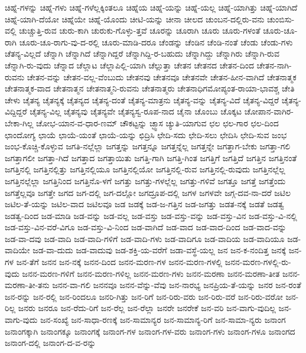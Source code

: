 {ಚಿಹ್ನೆ-ಗಳನ್ನು
ಚಿಹ್ನೆ-ಗಳು
ಚಿಹ್ನೆ-ಗಳೆಲ್ಲಕ್ಕಿಂತಲೂ
ಚಿಹ್ನೆಯ
ಚಿಹ್ನೆ-ಯನ್ನು
ಚಿಹ್ನೆ-ಯಲ್ಲ
ಚಿಹ್ನೆ-ಯಾಗಿತ್ತು
ಚಿಹ್ನೆ-ಯಾಗಿದೆ
ಚಿಹ್ನೆ-ಯಾಗಿ-ದೆಯೋ
ಚಿಹ್ನೆಯೇ
ಚಿಹ್ನೆ-ಯೊಂದು
ಚೀಟಿ-ಯನ್ನು
ಚೀನಾ
ಚೀಲದ
ಚುಂಬನ-ದಲ್ಲಿರು-ವನು
ಚುಂಬಿಸು-ವಲ್ಲಿ
ಚುಚ್ಚುತ್ತಿ-ರುವ
ಚುರು-ಕಾಗಿ
ಚುರುಕು-ಗೊಳ್ಳು-ತ್ತವೆ
ಚೂರನ್ನು
ಚೂರಾಗಿ
ಚೂರು
ಚೂರು-ಗಳಂತೆ
ಚೂರು-ಚೂ-ರಾಗಿ
ಚೂರು-ಚೂ-ರಾಗು-ವು-ದ-ರಲ್ಲಿ
ಚೂರು-ಮಾಡಿ-ದರೂ
ಚೆಂಡನ್ನು
ಚೆಂಡಿನ
ಚೆಂಡಿ-ನಂತೆ
ಚೆಂಡು
ಚೆಂಡು-ಗಳು
ಚೆತನ್ಯ-ವಿಲ್ಲದೆ
ಚೆನ್ನಾಗಿ
ಚೆನ್ನಾಗಿದೆ
ಚೆನ್ನಾಗಿದ್ದರೆ
ಚೆನ್ನಾಗಿದ್ದಿ-ರ-ಬಹುದು
ಚೆನ್ನಾಗಿದ್ದು
ಚೆನ್ನಾಗಿರು
ಚೆನ್ನಾಗಿ-ರುವ
ಚೆನ್ನಾಗಿ-ರು-ವುದು
ಚೆನ್ನಾದ
ಚೆಲ್ಲಾಟ
ಚೆಲ್ಲಾಪಿಲ್ಲಿ-ಯಾಗಿ
ಚೆಲ್ಲುತ್ತಾ
ಚೇತನ
ಚೇತನದ
ಚೇತನ-ದಿಂದ
ಚೇತನ-ನಾಗಿ-ರುವನು
ಚೇತನ-ವನ್ನು
ಚೇತನ-ವಲ್ಲ-ವೆಂಬುದು
ಚೇತನವು
ಚೇತನವೂ
ಚೇತನವೇ
ಚೇತನ-ಹೀನ-ವಾಗಿದೆ
ಚೇತನಾತ್ಮಕ
ಚೇತನಾತ್ಮಕ-ವಾದ
ಚೇತನಾತ್ಮನ
ಚೇತನಾತ್ಮನಿ-ರುವನು
ಚೇತನಾತ್ಮರು
ಚೇತನಾಧಿಗಮೋಪ್ಯಂತ-ರಾಯಾ-ಭಾವಶ್ಚ
ಚೇತಿ
ಚೇಳು
ಚೈತನ್ಯ
ಚೈತನ್ಯಕ್ಕೆ
ಚೈತನ್ಯದ
ಚೈತನ್ಯ-ದಂತೆ
ಚೈತನ್ಯ-ಮಾತ್ರನು
ಚೈತನ್ಯ-ವನ್ನು
ಚೈತನ್ಯ-ವಿದೆ
ಚೈತನ್ಯ-ವಿದ್ದರೆ
ಚೈತನ್ಯ-ವಿದ್ದಿದ್ದರೆ
ಚೈತನ್ಯ-ವಿಲ್ಲ
ಚೈತನ್ಯವು
ಚೈತನ್ಯವೇ
ಚೈತನ್ಯಸ್ವ-ರೂಪ-ನಾದ
ಚೈನಾ
ಚೊಂಬು
ಚೊಕ್ಕಟ
ಚೋಪಾನ-ವಾಗಿರ-ಬೇಕಾ-ಗಿಲ್ಲ
ಚೋಭ-ಯಾನ-ವ-ಧಾರ-ಣಮ್
ಚೌಕಟ್ಟನ್ನು
ಚ್ಛ್ವಾಸ
ಚ್ಯುತಿ-ಯಾಗುವ
ಛಲ
ಛಲ-ಗಾರ
ಛಲ-ದಿಂದ
ಛಾಂದೋಗ್ಯ
ಛಾಯೆ
ಛಾಯೆ-ಯಂತೆ
ಛಾಯೆ-ಯನ್ನು
ಛಿದ್ರಿಸಿ
ಛೇದಿ-ಸದು
ಛೇದಿ-ಸಲು
ಛೇದಿಸಿ
ಛೇದಿ-ಸುವ
ಜಂಭ
ಜಂಭ-ಕೊಚ್ಚಿ-ಕೊಳ್ಳುವ
ಜಗತಿ-ನಲ್ಲೆಲ್ಲಾ
ಜಗತ್ತನ್ನು
ಜಗತ್ತನ್ನೂ
ಜಗತ್ತನ್ನೆಲ್ಲ
ಜಗತ್ತನ್ನೇ
ಜಗತ್ತಾಗ-ಬೇಕು
ಜಗತ್ತಾ-ಗಲಿ
ಜಗತ್ತಾಗಲೀ
ಜಗತ್ತಾ-ಗಿದೆ
ಜಗತ್ತಾದ
ಜಗತ್ತಾಯಿತು
ಜಗತ್ತಿ-ಗಾಗಿ
ಜಗತ್ತಿ-ಗಿಂತ
ಜಗತ್ತಿಗೆ
ಜಗತ್ತಿದೆ
ಜಗತ್ತಿನ
ಜಗತ್ತಿನಂತೆ
ಜಗತ್ತಿನಲ್ಲಿ
ಜಗತ್ತಿನಲ್ಲಿತ್ತು
ಜಗತ್ತಿನಲ್ಲಿಯೂ
ಜಗತ್ತಿನಲ್ಲಿಯೋ
ಜಗತ್ತಿನಲ್ಲಿ-ರುವ
ಜಗತ್ತಿನಲ್ಲಿ-ರುವುದು
ಜಗತ್ತಿನಲ್ಲೆಲ್ಲ
ಜಗತ್ತಿನಲ್ಲೆಲ್ಲಾ
ಜಗತ್ತಿನಿಂದ
ಜಗತ್ತಿನೊ-ಳಗೆ
ಜಗತ್ತು
ಜಗತ್ತು-ಗಳಲ್ಲೆಲ್ಲ
ಜಗತ್ತು-ಗಳಿವೆ
ಜಗತ್ತೂ
ಜಗತ್ತೆ
ಜಗತ್ತೆಂದು
ಜಗತ್ತೆಲ್ಲವೂ
ಜಗತ್ತೇ
ಜಗದ
ಜಗ-ದಲ್ಲಿ
ಜಗ-ದಲ್ಲೋ
ಜಗದ್ರೂಪ-ದಲ್ಲಿ
ಜಗಳ
ಜಗಳವೇ
ಜಗ್ಗ-ದವ-ನಾ-ದರೆ
ಜಟಿಲ
ಜಟಿಲ-ತೆ-ಯನ್ನು
ಜಟಿಲ-ವಾದ
ಜಟಿಲವೂ
ಜಡ
ಜಡಕ್ಕೆ
ಜಡ-ಜ-ಗತ್ತಿನ
ಜಡ-ಜಗತ್ತು
ಜಡತ-ನಕ್ಕೆ
ಜಡತೆ
ಜಡತ್ವ
ಜಡತ್ವ-ದಿಂದ
ಜಡ-ಮಾಡಿ
ಜಡ-ವನ್ನು
ಜಡ-ವಲ್ಲ
ಜಡ-ವಸ್ತು
ಜಡ-ವಸ್ತು-ವನ್ನು
ಜಡ-ವಸ್ತು-ವಿನ
ಜಡ-ವಸ್ತು-ವಿ-ನಲ್ಲಿ
ಜಡ-ವಸ್ತು-ವಿನ-ವರೆ-ವಿಗೂ
ಜಡ-ವಸ್ತು-ವಿ-ನಿಂದ
ಜಡ-ವಾಗಿದೆ
ಜಡ-ವಾದ
ಜಡ-ವಾದ-ದಿಂದ
ಜಡ-ವಾದ-ವನ್ನು
ಜಡ-ವಾ-ದವು
ಜಡ-ವಾದಿ
ಜಡ-ವಾದಿ-ಗಳಿಗೆ
ಜಡ-ವಾದಿ-ಗಳು
ಜಡ-ವಾದಿಗೂ
ಜಡ-ವಾದಿಯ
ಜಡ-ವಾದಿಯೂ
ಜಡ-ವಾದಿಯೇ
ಜಡ-ವಾ-ದುದು
ಜಡ-ವಾದುವು
ಜಡ-ಶಕ್ತಿ-ಯ-ವರೆಗೆ
ಜಡಾ-ವಸ್ಥೆ-ಯಲ್ಲ
ಜನ
ಜನ-ಕ-ನಂದಿತ್ತ
ಜನಕ್ಕೆ
ಜನ-ಗಳ
ಜನ-ತೆಗೆ
ಜನನ
ಜನ-ನಕ್ಕೆ
ಜನನ-ದಿಂದ
ಜನನ-ಮರಣ-ಗಳ
ಜನನ-ಮರಣ-ಗಳಲ್ಲಿ
ಜನನ-ಮರಣ-ಗಳಲ್ಲಿ-ರು-ವುದು
ಜನನ-ಮರಣ-ಗಳಿಗೆ
ಜನನ-ಮರಣ-ಗಳಿಲ್ಲ
ಜನನ-ಮರಣ-ಗಳು
ಜನನ-ಮರಣಾ
ಜನನ-ಮರಣಾ-ತೀತ
ಜನನ-ಮರಣಾ-ತೀ-ತನು
ಜನನ-ವಾ-ಗಲಿ
ಜನನವೂ
ಜನನ-ವೆನ್ನು-ವೆವು
ಜನ-ನಾರಭ್ಯ
ಜನಪ್ರಿಯ-ತೆ-ಯನ್ನು
ಜನರ
ಜನ-ರಂತೆ
ಜನ-ರನ್ನು
ಜನ-ರಲ್ಲಿ
ಜನ-ರಿಂದಲೂ
ಜನರಿ-ಗಿತ್ತು
ಜನ-ರಿಗೆ
ಜನ-ರಿರು-ವರು
ಜನ-ರಿರು-ವರೆ
ಜನ-ರಿರು-ವರೋ
ಜನ-ರಿಲ್ಲ
ಜನರು
ಜನರೂ
ಜನ-ರೆದು-ರಿಗೆ
ಜನ-ರೆಲ್ಲ
ಜನ-ರೆಲ್ಲಾ
ಜನರೇ
ಜನರೇಕೆ
ಜನ-ವರಿ
ಜನ-ವಾಗು-ವುದಿಲ್ಲ
ಜನ-ವಾಗು-ವುದು
ಜನ-ಸಂಖ್ಯೆ
ಜನ-ಸಾಧಾ-ರಣಕ್ಕೆ
ಜನ-ಸಾಮಾನ್ಯರ
ಜನ-ಸಾಮಾನ್ಯ-ರಿಗೆ
ಜನ-ಸಾಮಾ-ನ್ಯರು
ಜನಾಂಗ
ಜನಾಂಗಕ್ಕಾಗಿ
ಜನಾಂಗಕ್ಕೂ
ಜನಾಂಗಕ್ಕೆ
ಜನಾಂಗ-ಗಳ
ಜನಾಂಗ-ಗಳ-ವರು
ಜನಾಂಗ-ಗಳು
ಜನಾಂಗ-ಗಳೂ
ಜನಾಂಗದ
ಜನಾಂಗ-ದಲ್ಲಿ
ಜನಾಂಗ-ದ-ವ-ರನ್ನು
}
